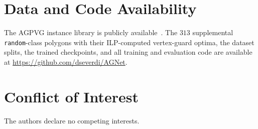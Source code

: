 \documentclass[preprint,10pt]{elsarticle}
\begin{document}
\section*{Data and Code Availability}

The AGPVG instance library is publicly available~\cite{art-gallery-instances-page}. The $313$ supplemental \texttt{random}-class polygons with their ILP-computed vertex-guard optima, the dataset splits, the trained checkpoints, and all training and evaluation code are available at \url{https://github.com/dseverdi/AGNet}.



\section*{Conflict of Interest}

The authors declare no competing interests.



\end{document}
